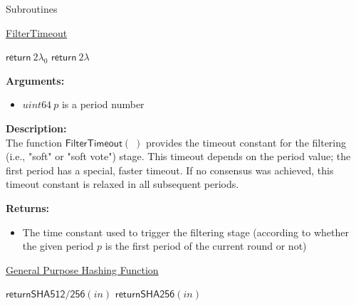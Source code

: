 \documentclass[10pt,a4paper]{article}
\begin{document}
\begin{section}{Subroutines}\label{sect:soubroutines}


\begin{algorithm}[H]
    \caption{\underline{FilterTimeout}}
    \label{algo:filter-timeout}
    \begin{algorithmic}[1]
            \State $\mathsf{return} \ 2\lambda_0$
        \Else 
            \State $\mathsf{return} \ 2\lambda$
        \EndIf
    \EndFunction
    \end{algorithmic}
\end{algorithm}

\noindent \textbf{Arguments:}
\begin{itemize}
    \item $uint64 \ p$ is a period number
  \end{itemize}

\noindent \textbf{Description:}\\
The function $\mathsf{FilterTimeout}(\;)$ provides the timeout 
constant for the filtering (i.e., "soft" or "soft vote") stage.
This timeout depends on the period value; the first period has a special, faster timeout.
If no consensus was achieved, this timeout constant is relaxed in all subsequent periods. 

\noindent \textbf{Returns:}
\begin{itemize}
    \item The time constant used to trigger the filtering stage (according to whether the given
    period $p$ is the first period of the current round or not)
  \end{itemize}


\begin{algorithm}[H]
    \caption{\underline{General Purpose Hashing Function}}
    \begin{algorithmic}[1]
            \State $\mathsf{return SHA512/256}(in)$
        \Else
            \State $\mathsf{return SHA256}(in)$
        \EndIf
    \EndFunction
    \end{algorithmic}
\end{algorithm}


\end{section}
\end{document}
